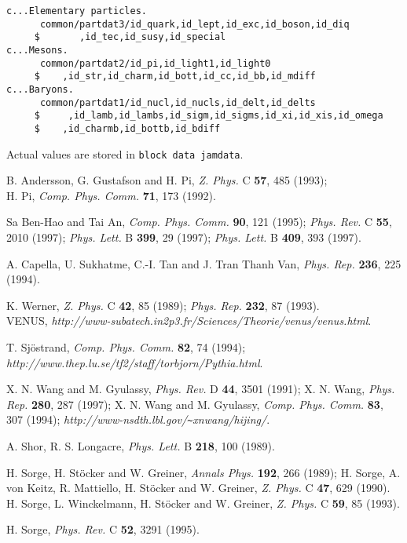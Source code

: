 \documentclass[]{article}
\newcommand{\ttt}[1]{{\tt#1}}
\def\Journal#1#2#3#4{{#1} {\bf #2}, #3 (#4)}
\def\PLB{{\em Phys. Lett.}  B}
\def\PR{{\em Phys. Rev.}}
\def\PRD{{\em Phys. Rev.} D}
\def\PRC{{\em Phys. Rev.} C}
\def\ZPC{{\em Z. Phys.} C}
\def\PR{{\em Phys. Rep.}}
\def\CPC{{\em Comp. Phys. Comm.}}
\def\ANP{{\em Annals Phys.}}
\begin{document}
\begin{verbatim}
c...Elementary particles.
      common/partdat3/id_quark,id_lept,id_exc,id_boson,id_diq
     $       ,id_tec,id_susy,id_special
c...Mesons.
      common/partdat2/id_pi,id_light1,id_light0
     $    ,id_str,id_charm,id_bott,id_cc,id_bb,id_mdiff
c...Baryons.
      common/partdat1/id_nucl,id_nucls,id_delt,id_delts
     $     ,id_lamb,id_lambs,id_sigm,id_sigms,id_xi,id_xis,id_omega
     $    ,id_charmb,id_bottb,id_bdiff
\end{verbatim}

Actual values are stored in \ttt{block data jamdata}.



\begin{thebibliography}{20}

      B. Andersson, G. Gustafson and H. Pi, \Journal{\ZPC}{57}{485}{1993};\\
      H. Pi, \Journal{\CPC}{71}{173}{1992}.

     Sa Ben-Hao and Tai An, \Journal{\CPC}{90}{121}{1995};
     \Journal{\PRC}{55}{2010}{1997};
     \Journal{\PLB}{399}{29}{1997};
     \Journal{\PLB}{409}{393}{1997}.

        A. Capella, U. Sukhatme, C.-I. Tan and J. Tran Thanh Van,
        \Journal{\PR}{236}{225}{1994}.

 K. Werner,
   \Journal{\ZPC}{42}{85}{1989};
   \Journal{\PR}{232}{87}{1993}.\\
 VENUS, 
{\em http://www-subatech.in2p3.fr/Sciences/Theorie/venus/venus.html}.

 T. Sj{\" o}strand, \Journal{\CPC}{82}{74}{1994};
      {\em http://www.thep.lu.se/tf2/staff/torbjorn/Pythia.html}.

        X. N. Wang and M. Gyulassy, \Journal{\PRD}{44}{3501}{1991};
        X. N. Wang, \Journal{\PR}{280}{287}{1997};
        X. N. Wang and M. Gyulassy, \Journal{\CPC}{83}{307}{1994};
        {\em http://www-nsdth.lbl.gov/\verb+~+xnwang/hijing/}.


 A. Shor, R. S. Longacre,
	\Journal{\PLB}{218}{100}{1989}.


H. Sorge, H. St\"ocker and W. Greiner, \Journal{\ANP}{192}{266}{1989};
H. Sorge, A. von Keitz, R. Mattiello, H. St\"ocker and W. Greiner,
  \Journal{\ZPC}{47}{629}{1990}.
H. Sorge, L. Winckelmann, H. St\"ocker and  W. Greiner,
 \Journal{\ZPC}{59}{85}{1993}.

H. Sorge, \Journal{\PRC}{52}{3291}{1995}.



\end{thebibliography}
\end{document}
